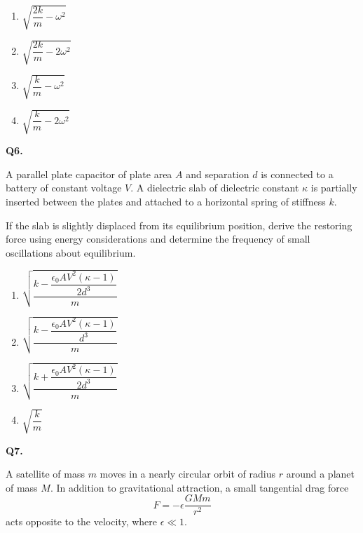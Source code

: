 \documentclass[12pt]{article}
\begin{document}
\begin{enumerate}
\item[(A)] $\sqrt{\dfrac{2k}{m}-\omega^2}$
\item[(B)] $\sqrt{\dfrac{2k}{m}-2\omega^2}$
\item[(C)] $\sqrt{\dfrac{k}{m}-\omega^2}$
\item[(D)] $\sqrt{\dfrac{k}{m}-2\omega^2}$
\end{enumerate}

\bigskip

\textbf{Q6.}

A parallel plate capacitor of plate area $A$ and separation $d$ is connected to a battery of constant voltage $V$. A dielectric slab of dielectric constant $\kappa$ is partially inserted between the plates and attached to a horizontal spring of stiffness $k$.

If the slab is slightly displaced from its equilibrium position, derive the restoring force using energy considerations and determine the frequency of small oscillations about equilibrium.

\begin{center}
\end{center}

\begin{enumerate}
\item[(A)] $\sqrt{\dfrac{k - \dfrac{\epsilon_0 A V^2 (\kappa -1)}{2d^3}}{m}}$
\item[(B)] $\sqrt{\dfrac{k - \dfrac{\epsilon_0 A V^2 (\kappa -1)}{d^3}}{m}}$
\item[(C)] $\sqrt{\dfrac{k + \dfrac{\epsilon_0 A V^2 (\kappa -1)}{2d^3}}{m}}$
\item[(D)] $\sqrt{\dfrac{k}{m}}$
\end{enumerate}

\bigskip

\textbf{Q7.}

A satellite of mass $m$ moves in a nearly circular orbit of radius $r$ around a planet of mass $M$. In addition to gravitational attraction, a small tangential drag force  
\[
F = -\epsilon \frac{GMm}{r^2}
\]
acts opposite to the velocity, where $\epsilon \ll 1$.
\end{document}
